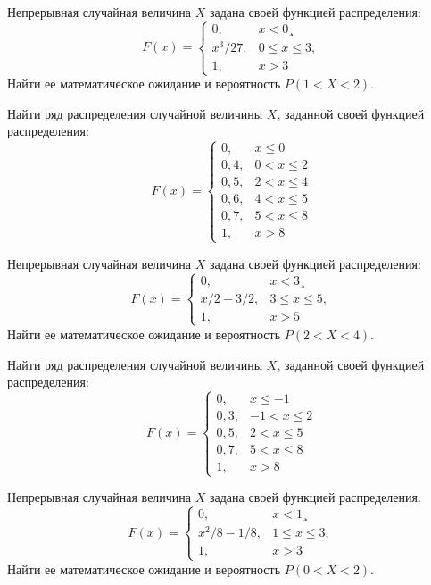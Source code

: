 \vfill

\z Непрерывная случайная величина $X$ задана своей функцией распределения: $$ F(x) = \begin{cases}0, & x < 0¸\\ x^3/27, & 0 \leqslant x \leqslant 3, \\ 1, & x > 3 \end{cases} $$ Найти ее математическое ожидание и вероятность $P(1 < X < 2)$.
 

\vfill

\newpage\setcounter{zad}{0}

\z Найти ряд распределения случайной величины $X$, заданной своей функцией распределения: $$ F(x) = \begin{cases}0, & x \leqslant 0 \\ 0{,}4, & 0 < x \leqslant 2 \\ 0{,}5, & 2 < x \leqslant 4 \\ 0{,}6, & 4 < x \leqslant 5 \\ 0{,}7, & 5 < x \leqslant 8 \\ 1, & x > 8 \end{cases} $$


\vfill

\z Непрерывная случайная величина $X$ задана своей функцией распределения: $$ F(x) = \begin{cases}0, & x < 3¸\\ x/2-3/2, & 3 \leqslant x \leqslant 5, \\ 1, & x > 5 \end{cases} $$ Найти ее математическое ожидание и вероятность $P(2 < X < 4)$.
 

\vfill

\newpage\setcounter{zad}{0}

\z Найти ряд распределения случайной величины $X$, заданной своей функцией распределения: $$ F(x) = \begin{cases}0, & x \leqslant -1 \\ 0{,}3, & -1 < x \leqslant 2 \\ 0{,}5, & 2 < x \leqslant 5 \\ 0{,}7, & 5 < x \leqslant 8 \\ 1, & x > 8 \end{cases} $$


\vfill

\z Непрерывная случайная величина $X$ задана своей функцией распределения: $$ F(x) = \begin{cases}0, & x < 1¸\\ x^2/8-1/8, & 1 \leqslant x \leqslant 3, \\ 1, & x > 3 \end{cases} $$ Найти ее математическое ожидание и вероятность $P(0 < X < 2)$.
 

